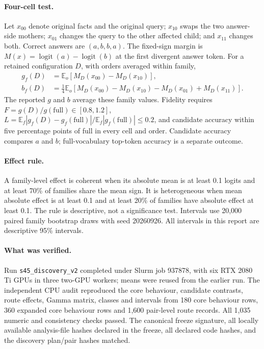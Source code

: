 \documentclass[11pt,a4paper]{article}
\newcommand{\file}[1]{\nolinkurl{#1}}
\begin{document}
\paragraph{Four-cell test.}
Let $x_{00}$ denote original facts and the original query; $x_{10}$ swaps the two
answer-side mothers; $x_{01}$ changes the query to the other affected child; and
$x_{11}$ changes both. Correct answers are $(a,b,b,a)$. The fixed-sign margin is
$M(x)=\operatorname{logit}(a)-\operatorname{logit}(b)$ at the first divergent
answer token. For a retained configuration $D$, with orders averaged within family,
\begin{align}
g_f(D)&=\mathbb{E}_o[M_D(x_{00})-M_D(x_{10})],\label{eq:gap}\\
b_f(D)&=\tfrac14\mathbb{E}_o[M_D(x_{00})-M_D(x_{10})-M_D(x_{01})+M_D(x_{11})].\label{eq:binding}
\end{align}
The reported $g$ and $b$ average these family values. Fidelity requires
$F=g(D)/g(\mathrm{full})\in[0.8,1.2]$,
$L=\mathbb{E}_f|g_f(D)-g_f(\mathrm{full})|/\mathbb{E}_f|g_f(\mathrm{full})|\leq0.2$,
and candidate accuracy within five percentage points of full in every cell and
order. Candidate accuracy compares $a$ and $b$; full-vocabulary top-token accuracy
is a separate outcome.

\paragraph{Effect rule.}
A family-level effect is coherent when its absolute mean is at least 0.1 logits
and at least 70\% of families share the mean sign. It is heterogeneous when mean
absolute effect is at least 0.1 and at least 20\% of families have absolute effect
at least 0.1. The rule is descriptive, not a significance test. Intervals use
20,000 paired family bootstrap draws with seed 20260926. All intervals in this
report are descriptive 95\% intervals.

\paragraph{What was verified.}
Run \file{s45_discovery_v2} completed under Slurm job 937878, with six RTX 2080 Ti
GPUs in three two-GPU workers; means were reused from the earlier run. The
independent CPU audit reproduced the core behaviour, candidate contrasts, route
effects, Gamma matrix, classes and intervals from 180 core behaviour rows, 360
expanded core behaviour rows and 1,600 pair-level route records. All 1,035 numeric
and consistency checks passed. The canonical freeze signature, all locally
available analysis-file hashes declared in the freeze, all declared code hashes,
and the discovery plan/pair hashes matched.
\end{document}
